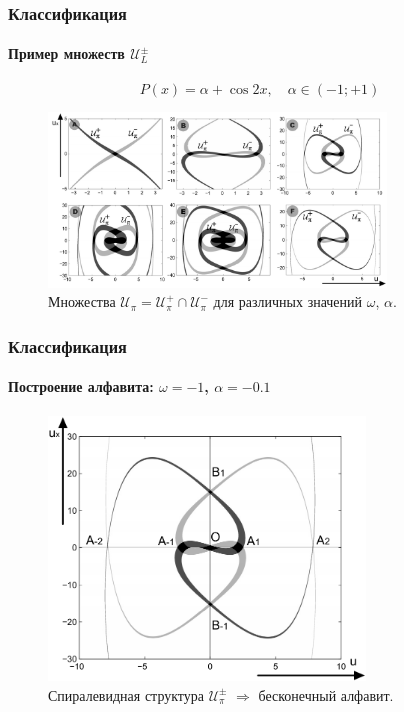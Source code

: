 \documentclass [10pt] {beamer}
\begin{document}
\begin{frame}
	\frametitle{Классификация}
	\framesubtitle{Пример множеств $\mathscr{U}_L^{\pm}$}
	$$P(x) = \alpha + \cos{2x}, \quad \alpha \in (-1; +1)$$
	\begin{figure}
		\includegraphics[width=0.8\textwidth]{pic/sets.pdf}
		\caption{Множества $\mathscr{U}_{\pi} = \mathscr{U}_{\pi}^+ \cap \mathscr{U}_{\pi}^-$ для различных значений $\omega$, $\alpha$.}
		\label{pic:sets}
	\end{figure}
\end{frame}

\begin{frame}
	\frametitle{Классификация}
	\framesubtitle{Построение алфавита: $\omega = -1$, $\alpha = -0.1$}
	\begin{figure}
		\includegraphics[width=0.75\textwidth]{pic/alphabet.pdf}
		\caption{Спиралевидная структура $\mathscr{U}_{\pi}^{\pm}$ $\Rightarrow$ бесконечный алфавит.}
		\label{pic:alphabet}
	\end{figure}
\end{frame}
\end{document}
